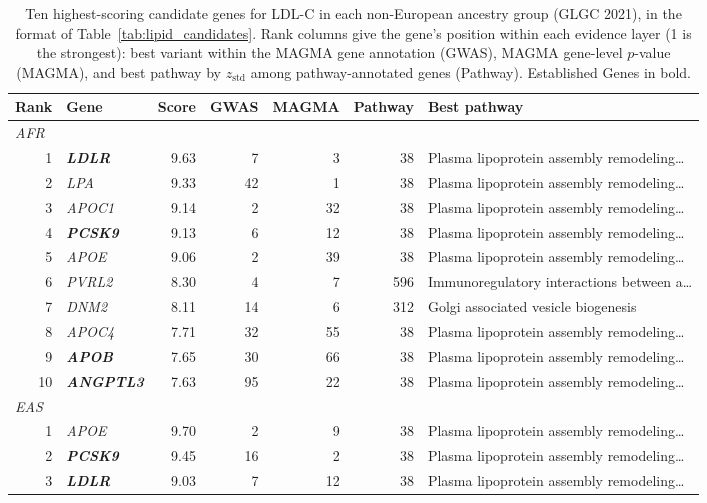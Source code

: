 \begin{table}[!t]
\centering
\caption{Ten highest-scoring candidate genes for LDL-C in each non-European ancestry group (GLGC 2021), in the format of Table~\ref{tab:lipid_candidates}. Rank columns give the gene's position within each evidence layer (1 is the strongest): best variant within the MAGMA gene annotation (GWAS), MAGMA gene-level $p$-value (MAGMA), and best pathway by $z_{\mathrm{std}}$ among pathway-annotated genes (Pathway). Established Genes in bold.}
\label{tab:replication_candidates_ldl}
\footnotesize
\begin{tabular}{rlrrrrl}
\hline
\textbf{Rank} & \textbf{Gene} & \textbf{Score} & \textbf{GWAS} & \textbf{MAGMA} & \textbf{Pathway} & \textbf{Best pathway} \\
\hline
\multicolumn{7}{l}{\textit{AFR}} \\
1 & \textbf{\textit{LDLR}} & 9.63 & 7 & 3 & 38 & Plasma lipoprotein assembly remodeling\ldots \\
2 & \textit{LPA} & 9.33 & 42 & 1 & 38 & Plasma lipoprotein assembly remodeling\ldots \\
3 & \textit{APOC1} & 9.14 & 2 & 32 & 38 & Plasma lipoprotein assembly remodeling\ldots \\
4 & \textbf{\textit{PCSK9}} & 9.13 & 6 & 12 & 38 & Plasma lipoprotein assembly remodeling\ldots \\
5 & \textit{APOE} & 9.06 & 2 & 39 & 38 & Plasma lipoprotein assembly remodeling\ldots \\
6 & \textit{PVRL2} & 8.30 & 4 & 7 & 596 & Immunoregulatory interactions between a\ldots \\
7 & \textit{DNM2} & 8.11 & 14 & 6 & 312 & Golgi associated vesicle biogenesis \\
8 & \textit{APOC4} & 7.71 & 32 & 55 & 38 & Plasma lipoprotein assembly remodeling\ldots \\
9 & \textbf{\textit{APOB}} & 7.65 & 30 & 66 & 38 & Plasma lipoprotein assembly remodeling\ldots \\
10 & \textbf{\textit{ANGPTL3}} & 7.63 & 95 & 22 & 38 & Plasma lipoprotein assembly remodeling\ldots \\
\multicolumn{7}{l}{\textit{EAS}} \\
1 & \textit{APOE} & 9.70 & 2 & 9 & 38 & Plasma lipoprotein assembly remodeling\ldots \\
2 & \textbf{\textit{PCSK9}} & 9.45 & 16 & 2 & 38 & Plasma lipoprotein assembly remodeling\ldots \\
3 & \textbf{\textit{LDLR}} & 9.03 & 7 & 12 & 38 & Plasma lipoprotein assembly remodeling\ldots \\

\end{tabular}
\end{table}
